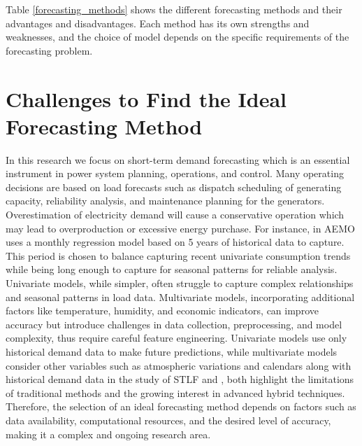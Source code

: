 \documentclass[mstat,12pt]{unswthesis}
\begin{document}
Table \ref{forecasting_methods} shows the different forecasting methods
and their advantages and disadvantages. Each method has its own
strengths and weaknesses, and the choice of model depends on the
specific requirements of the forecasting problem.

\bigskip

\section{Challenges to Find the Ideal Forecasting
Method}\label{challenges-to-find-the-ideal-forecasting-method}

In this research we focus on short-term demand forecasting which is an
essential instrument in power system planning, operations, and control.
Many operating decisions are based on load forecasts such as dispatch
scheduling of generating capacity, reliability analysis, and maintenance
planning for the generators. Overestimation of electricity demand will
cause a conservative operation which may lead to overproduction or
excessive energy purchase. For instance, in \cite{AEMO} AEMO uses a
monthly regression model based on 5 years of historical data to capture.
This period is chosen to balance capturing recent univariate consumption
trends while being long enough to capture for seasonal patterns for
reliable analysis. Univariate models, while simpler, often struggle to
capture complex relationships and seasonal patterns in load data.
Multivariate models, incorporating additional factors like temperature,
humidity, and economic indicators, can improve accuracy but introduce
challenges in data collection, preprocessing, and model complexity, thus
require careful feature engineering. Univariate models use only
historical demand data to make future predictions, while multivariate
models consider other variables such as atmospheric variations and
calendars along with historical demand data in the study of STLF
\cite{wang2016review} and \cite{chen2015electricity}, both highlight the
limitations of traditional methods and the growing interest in advanced
hybrid techniques. Therefore, the selection of an ideal forecasting
method depends on factors such as data availability, computational
resources, and the desired level of accuracy, making it a complex and
ongoing research area.
\end{document}

